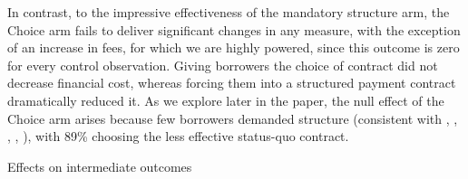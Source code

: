 \documentclass[12pt, a4paper, colorinlistoftodos]{article}
\begin{document}
In contrast, to the impressive effectiveness of the mandatory structure arm, the Choice arm fails to deliver significant changes in any measure, with the exception of an increase in fees, for which we are highly powered, since this outcome is zero for every control observation. Giving borrowers the choice of contract did not decrease financial cost, whereas forcing them into a structured payment contract dramatically reduced it. As we explore later in the paper, the null effect of the Choice arm arises because few borrowers demanded structure (consistent with \cite{Ashraf}, \cite{Gine}, \cite{Ted}, \cite{Royer}, \cite{Sprenger}), with 89\% choosing the less effective status-quo contract.





\begin{landscape}
  
\begin{table}[!h]
\caption{Effects on intermediate outcomes}
\label{mechanisms}
\begin{center}

\scriptsize{}


\end{center}
\end{table}
\end{landscape}
\end{document}
